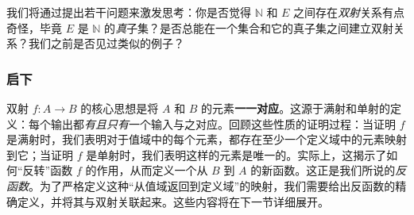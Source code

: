 我们将通过提出若干问题来激发思考：你是否觉得 $\mathbb{N}$ 和 $E$ 之间存在\emph{双射}关系有点奇怪，毕竟 $E$ 是 $\mathbb{N}$ 的\emph{真}子集？是否总能在一个集合和它的真子集之间建立双射关系？我们之前是否见过类似的例子？

\subsubsection*{启下} 

双射 $f : A \to B$ 的核心思想是将 $A$ 和 $B$ 的元素\textbf{一一对应}。这源于满射和单射的定义：每个输出都\emph{有且只有}一个输入与之对应。回顾这些性质的证明过程：当证明 $f$ 是满射时，我们表明对于值域中的每个元素，都存在至少一个定义域中的元素映射到它；当证明 $f$ 是单射时，我们表明这样的元素是唯一的。实际上，这揭示了如何``反转''函数 $f$ 的作用，从而定义一个从 $B$ 到 $A$ 的新函数。这正是我们所说的\emph{反函数}。为了严格定义这种``从值域返回到定义域''的映射，我们需要给出反函数的精确定义，并将其与双射关联起来。这些内容将在下一节详细展开。

